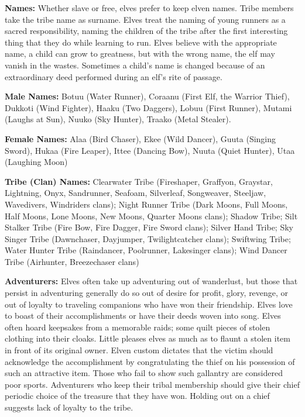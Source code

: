 \textbf{Names:} Whether slave or free, elves prefer to keep elven names. Tribe members take the tribe name as surname. Elves treat the naming of young runners as a sacred responsibility, naming the children of the tribe after the first interesting thing that they do while learning to run. Elves believe with the appropriate name, a child can grow to greatness, but with the wrong name, the elf may vanish in the wastes. Sometimes a child's name is changed because of an extraordinary deed performed during an elf's rite of passage.

\textbf{Male Names:} Botuu (Water Runner), Coraanu (First Elf, the Warrior Thief), Dukkoti (Wind Fighter), Haaku (Two Daggers), Lobuu (First Runner), Mutami (Laughs at Sun), Nuuko (Sky Hunter), Traako (Metal Stealer).

\textbf{Female Names:} Alaa (Bird Chaser), Ekee (Wild Dancer), Guuta (Singing Sword), Hukaa (Fire Leaper), Ittee (Dancing Bow), Nuuta (Quiet Hunter), Utaa (Laughing Moon)

\textbf{Tribe (Clan) Names:} Clearwater Tribe (Fireshaper, Graffyon, Graystar, Lightning, Onyx, Sandrunner, Seafoam, Silverleaf, Songweaver, Steeljaw, Wavedivers, Windriders clans); Night Runner Tribe (Dark Moons, Full Moons, Half Moons, Lone Moons, New Moons, Quarter Moons clans); Shadow Tribe; Silt Stalker Tribe (Fire Bow, Fire Dagger, Fire Sword clans); Silver Hand Tribe; Sky Singer Tribe (Dawnchaser, Dayjumper, Twilightcatcher clans); Swiftwing Tribe; Water Hunter Tribe (Raindancer, Poolrunner, Lakesinger clans); Wind Dancer Tribe (Airhunter, Breezechaser clans)

\textbf{Adventurers:} Elves often take up adventuring out of wanderlust, but those that persist in adventuring generally do so out of desire for profit, glory, revenge, or out of loyalty to traveling companions who have won their friendship. Elves love to boast of their accomplishments or have their deeds woven into song. Elves often hoard keepsakes from a memorable raids; some quilt pieces of stolen clothing into their cloaks. Little pleases elves as much as to flaunt a stolen item in front of its original owner. Elven custom dictates that the victim should acknowledge the accomplishment by congratulating the thief on his possession of such an attractive item. Those who fail to show such gallantry are considered poor sports. Adventurers who keep their tribal membership should give their chief periodic choice of the treasure that they have won. Holding out on a chief suggests lack of loyalty to the tribe.

